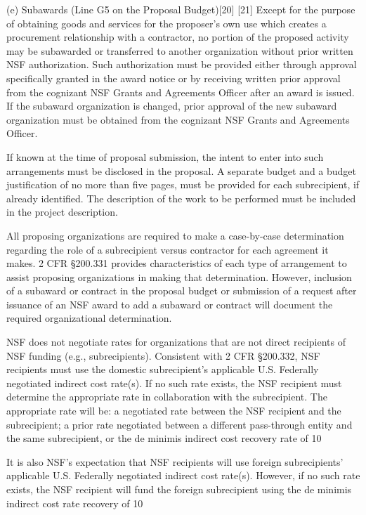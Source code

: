 {(e) Subawards (Line G5 on the Proposal Budget)[20] [21]
Except for the purpose of obtaining goods and services for the proposer's own use which creates a procurement relationship with a contractor, no portion of the proposed activity may be subawarded or transferred to another organization without prior written NSF authorization. Such authorization must be provided either through approval specifically granted in the award notice or by receiving written prior approval from the cognizant NSF Grants and Agreements Officer after an award is issued. If the subaward organization is changed, prior approval of the new subaward organization must be obtained from the cognizant NSF Grants and Agreements Officer.

If known at the time of proposal submission, the intent to enter into such arrangements must be disclosed in the proposal. A separate budget and a budget justification of no more than five pages, must be provided for each subrecipient, if already identified. The description of the work to be performed must be included in the project description.

All proposing organizations are required to make a case-by-case determination regarding the role of a subrecipient versus contractor for each agreement it makes. 2 CFR §200.331 provides characteristics of each type of arrangement to assist proposing organizations in making that determination. However, inclusion of a subaward or contract in the proposal budget or submission of a request after issuance of an NSF award to add a subaward or contract will document the required organizational determination.

NSF does not negotiate rates for organizations that are not direct recipients of NSF funding (e.g., subrecipients). Consistent with 2 CFR §200.332, NSF recipients must use the domestic subrecipient’s applicable U.S. Federally negotiated indirect cost rate(s). If no such rate exists, the NSF recipient must determine the appropriate rate in collaboration with the subrecipient. The appropriate rate will be: a negotiated rate between the NSF recipient and the subrecipient; a prior rate negotiated between a different pass-through entity and the same subrecipient, or the de minimis indirect cost recovery rate of 10%

It is also NSF’s expectation that NSF recipients will use foreign subrecipients’ applicable U.S. Federally negotiated indirect cost rate(s). However, if no such rate exists, the NSF recipient will fund the foreign subrecipient using the de minimis indirect cost rate recovery of 10%

}
